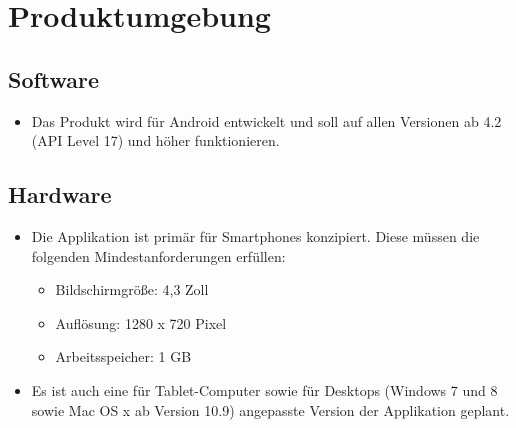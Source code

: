 \section{Produktumgebung}

\subsection{Software}
\begin{itemize}
	\item Das Produkt wird für Android entwickelt und soll auf allen Versionen ab 4.2 (API Level 17) und höher funktionieren.
\end{itemize}

\subsection{Hardware}
\begin{itemize}
	\item Die Applikation ist primär für Smartphones konzipiert. Diese müssen die folgenden Mindestanforderungen erfüllen:
	\begin{itemize}
		\item Bildschirmgröße: 4,3 Zoll
		\item Auflösung: 1280 x 720 Pixel
		\item Arbeitsspeicher: 1 GB
	\end{itemize}
	\item Es ist auch eine für Tablet-Computer sowie für Desktops (Windows 7 und 8 sowie Mac OS x ab Version 10.9) angepasste Version der Applikation geplant.
\end{itemize}
